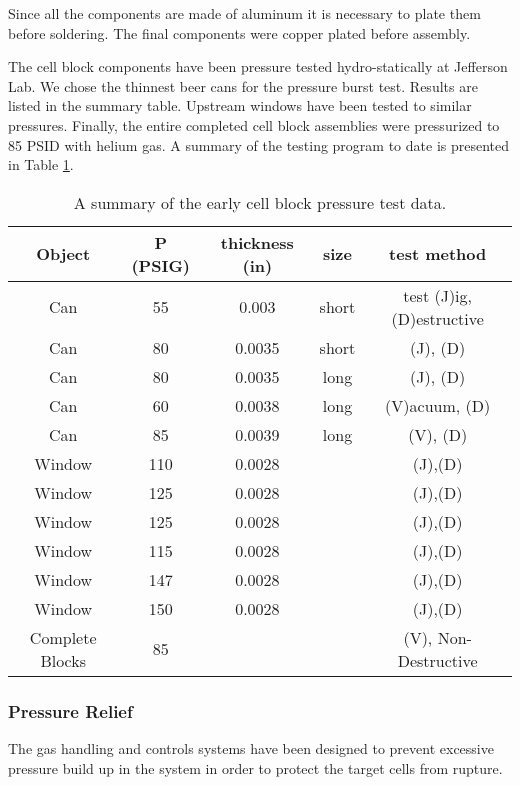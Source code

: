 {\begin{safetyen}{10}{5}
Since all the components are made of aluminum it is necessary to plate
them before soldering. The final components were copper
plated before assembly. 

The cell block components have been pressure tested hydro-statically at
Jefferson Lab.
We chose the thinnest beer cans for the pressure burst test.
 Results are listed
in the summary table.
Upstream windows have been tested
to similar pressures. Finally, the entire completed cell block
assemblies were pressurized to 85 PSID with helium gas.
A summary of the testing program to date is presented
in Table \ref{ta:test}.

\begin{table}[htb]
\begin{center}
\begin{tabular}{|c|c|c|c|c|} \hline
Object & P (PSIG) & thickness (in) & size & test method \\ \hline
Can & 55  & 0.003 &short &test (J)ig, (D)estructive \\ \hline
Can & 80 & 0.0035 &short &(J), (D) \\ \hline
Can & 80 & 0.0035 &long &(J), (D) \\ \hline
Can & 60 & 0.0038 &long &(V)acuum, (D) \\ \hline
Can & 85 & 0.0039 &long &(V), (D) \\ \hline
Window & 110 &0.0028& &(J),(D) \\ \hline
Window & 125 &0.0028& &(J),(D) \\ \hline
Window & 125 &0.0028& &(J),(D) \\ \hline
Window & 115 &0.0028& &(J),(D) \\ \hline
Window & 147 &0.0028& &(J),(D) \\ \hline
Window & 150 &0.0028& &(J),(D) \\ \hline
Complete Blocks & 85 &&&(V), Non-Destructive \\ \hline
\end{tabular}
\end{center}
\caption[Cryotarget: Cell Pressure Test Data]{A summary of the early cell block pressure test data.}
\label{ta:test}
\end{table}

\subsubsection{ Pressure Relief}

The gas handling and controls systems have been designed to 
prevent excessive pressure build up in the system in order to
protect the target cells from rupture.


\end{safetyen}}
